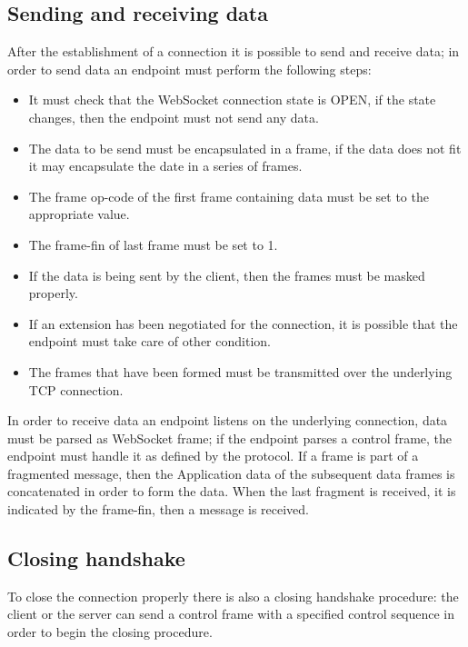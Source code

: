 \subsection{Sending and receiving data}
After the establishment of a connection it is possible to send and receive data; in order to send data an endpoint must perform the following steps:
\begin{itemize}
	\item It must check that the WebSocket connection state is OPEN, if the state changes, then the endpoint must not send any data.
	\item The data to be send must be encapsulated in a frame, if the data does not fit it may encapsulate the date in a series of frames.
	\item The frame op-code of the first frame containing data must be set to the appropriate value.
	\item The frame-fin of last frame must be set to 1.
	\item If the data is being sent by the client, then the frames must be masked properly.
	\item If an extension has been negotiated for the connection, it is possible that the endpoint must take care of other condition.
	\item The frames that have been formed must be transmitted over the underlying TCP connection.
\end{itemize}

In order to receive data an endpoint listens on the underlying connection, data must be parsed as WebSocket frame;
if the endpoint parses a control frame, the endpoint must handle it as defined by the protocol.\newline
If a frame is part of a fragmented message, then the Application data of the subsequent data frames is concatenated in order to form the data.\newline
When the last fragment is received, it is indicated by the frame-fin, then a message is received.\newline

\subsection{Closing handshake}
To close the connection properly there is also a closing handshake procedure: the client or
the server can send a control frame with a specified control sequence in order to begin the closing procedure.\newline


